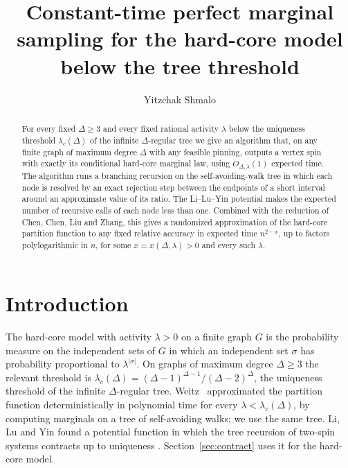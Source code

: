 \documentclass[11pt]{amsart}
\title[Perfect marginal sampling for the hard-core model]{Constant-time perfect marginal sampling for the hard-core model below the tree threshold}
\author{Yitzchak Shmalo}
\date{}
\newcommand{\lc}{\lambda_c(\Delta)}
\begin{document}
\begin{abstract}
For every fixed $\Delta\ge 3$ and every fixed rational activity $\lambda$ below the uniqueness threshold $\lc$ of the infinite $\Delta$-regular tree we give an algorithm that, on any finite graph of maximum degree $\Delta$ with any feasible pinning, outputs a vertex spin with exactly its conditional hard-core marginal law, using $O_{\Delta,\lambda}(1)$ expected time. The algorithm runs a branching recursion on the self-avoiding-walk tree in which each node is resolved by an exact rejection step between the endpoints of a short interval around an approximate value of its ratio. The Li--Lu--Yin potential makes the expected number of recursive calls of each node less than one. Combined with the reduction of Chen, Chen, Liu and Zhang, this gives a randomized approximation of the hard-core partition function to any fixed relative accuracy in expected time $n^{2-x}$, up to factors polylogarithmic in $n$, for some $x=x(\Delta,\lambda)>0$ and every such $\lambda$.
\end{abstract}

\maketitle

\section{Introduction}\label{sec:intro}

The hard-core model with activity $\lambda>0$ on a finite graph $G$ is the probability measure on the independent sets of $G$ in which an independent set $\sigma$ has probability proportional to $\lambda^{|\sigma|}$. On graphs of maximum degree $\Delta\ge3$ the relevant threshold is $\lc=(\Delta-1)^{\Delta-1}/(\Delta-2)^{\Delta}$, the uniqueness threshold of the infinite $\Delta$-regular tree. Weitz~\cite[Corollary~2.8]{W06} approximated the partition function deterministically in polynomial time for every $\lambda<\lc$, by computing marginals on a tree of self-avoiding walks; we use the same tree. Li, Lu and Yin found a potential function \cite[Section~3]{LLY} in which the tree recursion of two-spin systems contracts up to uniqueness \cite[Definition~7 and Lemma~12]{LLY}. Section~\ref{sec:contract} uses it for the hard-core model.
\end{document}
